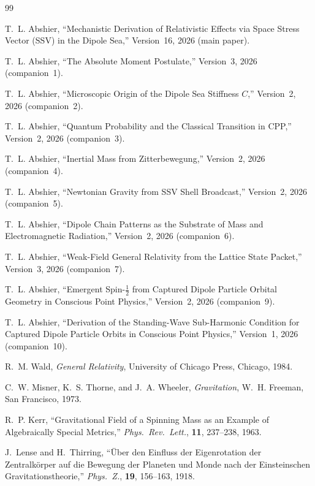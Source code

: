 \documentclass[12pt]{article}
\begin{document}
\begin{thebibliography}{99}

T.~L. Abshier,
``Mechanistic Derivation of Relativistic Effects via Space Stress
Vector (SSV) in the Dipole Sea,''
Version~16, 2026 (main paper).

T.~L. Abshier,
``The Absolute Moment Postulate,''
Version~3, 2026 (companion~1).

T.~L. Abshier,
``Microscopic Origin of the Dipole Sea Stiffness $C$,''
Version~2, 2026 (companion~2).

T.~L. Abshier,
``Quantum Probability and the Classical Transition in CPP,''
Version~2, 2026 (companion~3).

T.~L. Abshier,
``Inertial Mass from Zitterbewegung,''
Version~2, 2026 (companion~4).

T.~L. Abshier,
``Newtonian Gravity from SSV Shell Broadcast,''
Version~2, 2026 (companion~5).

T.~L. Abshier,
``Dipole Chain Patterns as the Substrate of Mass and
Electromagnetic Radiation,''
Version~2, 2026 (companion~6).

T.~L. Abshier,
``Weak-Field General Relativity from the Lattice State Packet,''
Version~3, 2026 (companion~7).

T.~L. Abshier,
``Emergent Spin-$\tfrac{1}{2}$ from Captured Dipole Particle
Orbital Geometry in Conscious Point Physics,''
Version~2, 2026 (companion~9).

T.~L. Abshier,
``Derivation of the Standing-Wave Sub-Harmonic Condition
for Captured Dipole Particle Orbits in Conscious Point Physics,''
Version~1, 2026 (companion~10).

R.~M. Wald,
\textit{General Relativity},
University of Chicago Press, Chicago, 1984.

C.~W. Misner, K.~S. Thorne, and J.~A. Wheeler,
\textit{Gravitation},
W.~H. Freeman, San Francisco, 1973.

R.~P. Kerr,
``Gravitational Field of a Spinning Mass as an Example of
Algebraically Special Metrics,''
\textit{Phys.\ Rev.\ Lett.}, \textbf{11}, 237--238, 1963.

J.~Lense and H.~Thirring,
``\"Uber den Einfluss der Eigenrotation der Zentralk\"orper auf die
Bewegung der Planeten und Monde nach der Einsteinschen
Gravitationstheorie,''
\textit{Phys.\ Z.}, \textbf{19}, 156--163, 1918.


\end{thebibliography}
\end{document}
